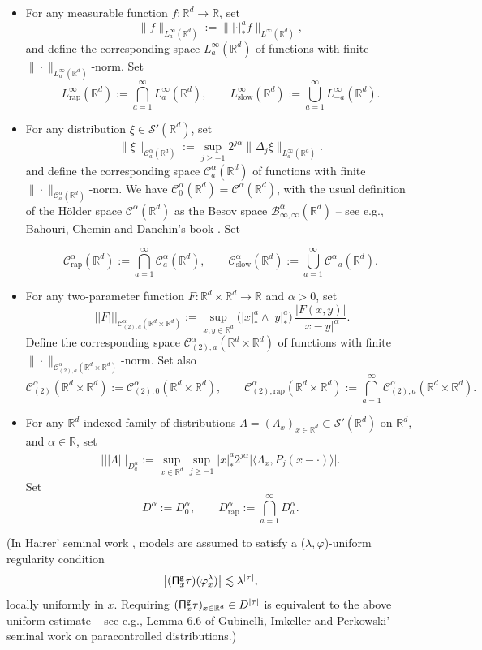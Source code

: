 \documentclass[11pt]{article}
\newcommand{\eg}{e.g.,\xspace}
\numberwithin{equation}{section}
\theoremstyle{plain}
\theoremstyle{definition}
\newcommand{\trino}[1]{|\!|\!|#1|\!|\!|}
\newcommand{\rap}{\mathrm{rap}}
\newcommand{\slow}{\mathrm{slow}}
\newcommand{\sfg}{\mathsf{g}}
\newcommand{\bbR}{\mathbb{R}}
\newcommand{\mcB}{\mathcal{B}}
\newcommand{\mcC}{\mathcal{C}}
\newcommand\mcS{\mathcal{S}}
\begin{document}
\begin{itemize}
	\item For any measurable function $f:\bbR^d\to\bbR$, set
\[
\|f\|_{L_a^\infty(\bbR^d)} := \big\||{\cdot}|_*^a f\big\|_{L^\infty(\bbR^d)},
\]
and define the corresponding space $L_a^\infty(\bbR^d)$ of functions with finite $\|{\cdot}\|_{L_a^\infty(\bbR^d)}$-norm. Set
\[
L_{\rap}^\infty(\bbR^d) := \bigcap_{a=1}^\infty L_a^\infty(\bbR^d), \qquad L_{\slow}^\infty(\bbR^d) := \bigcup_{a=1}^\infty L_{-a}^\infty(\bbR^d).
\]

	\item For any distribution $\xi\in\mcS'(\bbR^d)$, set
\[
\|\xi\|_{\mcC_a^\alpha(\bbR^d)} := \sup_{j\ge-1}2^{j\alpha}\|\Delta_j\xi\|_{L_a^\infty(\bbR^d)}.
\]
and define the corresponding space $\mcC_a^\alpha(\bbR^d)$ of functions with finite $\|{\cdot}\|_{\mcC_a^\alpha(\bbR^d)}$-norm. We have $\mcC^\alpha_0(\bbR^d) = \mcC^\alpha(\bbR^d)$, with the usual definition of the Hölder space $\mcC^\alpha(\bbR^d)$ as the Besov space $\mcB^\alpha_{\infty,\infty}(\bbR^d)$ -- see \eg Bahouri, Chemin and Danchin's book \cite{BCD11}. Set

\[
\mcC_\rap^\alpha(\bbR^d) := \bigcap_{a=1}^\infty \mcC_a^\alpha(\bbR^d), \qquad \mcC_\slow^\alpha(\bbR^d) := \bigcup_{a=1}^\infty \mcC_{-a}^\alpha(\bbR^d).
\]

	\item For any two-parameter function $F:\bbR^d\times\bbR^d\to\bbR$ and $\alpha>0$, set
\[
\trino{F}_{\mcC_{(2),a}^\alpha(\bbR^d\times\bbR^d)} := \sup_{x,y\in\bbR^d}\bigl(|x|_*^a\wedge|y|_*^a\bigr)\,\frac{\big|F(x,y)\big|}{|x-y|^\alpha}.
\]
Define the corresponding space $\mcC_{(2),a}^\alpha(\bbR^d\times\bbR^d)$ of functions with finite $\|{\cdot}\|_{\mcC_{(2),a}^\alpha(\bbR^d\times\bbR^d)}$-norm. Set also
\[
\mcC_{(2)}^\alpha(\bbR^d\times\bbR^d) := \mcC_{(2),0}^\alpha(\bbR^d\times\bbR^d), \qquad \mcC^\alpha_{(2),\rap}(\bbR^d\times\bbR^d) := \bigcap_{a=1}^\infty \mcC^\alpha_{(2),a}(\bbR^d\times\bbR^d).
\]

	\item For any $\bbR^d$-indexed family of distributions $\Lambda=(\Lambda_x)_{x\in\bbR^d}\subset\mcS'(\bbR^d)$ on $\bbR^d$, and $\alpha\in\bbR$, set
\begin{align*}
\trino{\Lambda}_{D_a^\alpha}:=\sup_{x\in\bbR^d}\sup_{j\ge-1}|x|_*^a2^{j\alpha}\big| \langle\Lambda_x, P_j(x-\cdot)\rangle\big|.
\end{align*}
Set\vspace*{-3pt}
\[
D^\alpha:=D_0^\alpha, \qquad D_\rap^\alpha := \bigcap_{a=1}^\infty D^\alpha_a.
\]
\end{itemize}
(In Hairer' seminal work \cite{Hai}, models are assumed to satisfy a ($\lambda, \varphi$)-uniform regularity condition\vspace*{-3pt}
\[
\big|({\sf \Pi}^{\sfg}_x\tau)(\varphi_x^\lambda)\big|\lesssim\lambda^{|\tau|},
\]
locally uniformly in $x$. Requiring $({\sf \Pi}^{\sfg}_x\tau)_{x\in\bbR^d}\in D^{|\tau|}$ is equivalent to the above uniform estimate -- see \eg Lemma 6.6 of Gubinelli, Imkeller and Perkowski' seminal work \cite{GIP} on paracontrolled distributions.)
\end{document}
